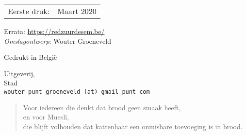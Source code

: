 \begin{center}
\begin{tabular}{ll}
Eerste druk:  & Maart 2020 \\
\end{tabular}
\end{center}

\vfill

Errata: \url{https://redzuurdesem.be/} \\

\hspace*{2em} \textit{Omslagontwerp}: Wouter Groeneveld \\

\vfill

Gedrukt in België

Uitgeverij, \\
Stad \\
\texttt{wouter punt groeneveld (at) gmail punt com}

\vspace*{2\baselineskip}


\clearpage

 \newenvironment{dedication}
     {\vspace{6ex}\begin{quotation}\begin{center}\begin{em}}
     {\par\end{em}\end{center}\end{quotation}}

\begin{dedication}
	Voor iedereen die denkt dat brood geen smaak heeft, \\
	en voor Muesli, \\
  die blijft volhouden dat kattenhaar een onmisbare toevoeging is in brood. 
\end{dedication}

\endgroup
\clearpage
\pagestyle{plain}
